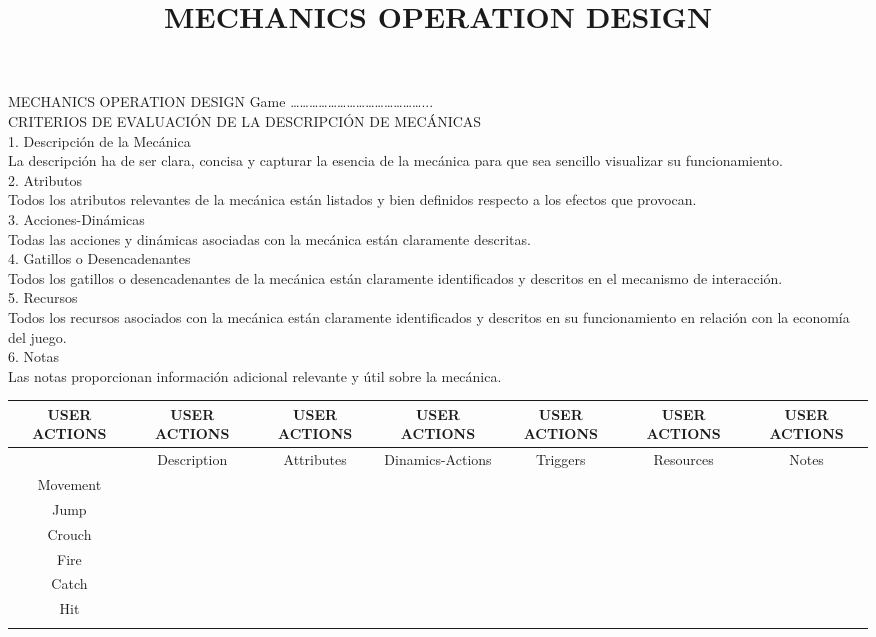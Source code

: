 \documentclass[12pt]{article}
\title{MECHANICS OPERATION DESIGN}
\date{}
\begin{document}
\maketitle

MECHANICS OPERATION DESIGN  Game ……………………………………... \\ 
CRITERIOS DE EVALUACIÓN DE LA DESCRIPCIÓN DE MECÁNICAS \\ 
1. Descripción de la Mecánica \\ 
La descripción ha de ser clara, concisa y capturar la esencia de la mecánica para que sea sencillo visualizar su funcionamiento. \\ 
2. Atributos \\ 
Todos los atributos relevantes de la mecánica están listados y bien definidos respecto a los efectos que provocan. \\ 
3. Acciones-Dinámicas \\ 
Todas las acciones y dinámicas asociadas con la mecánica están claramente descritas. \\ 
4. Gatillos o Desencadenantes \\ 
Todos los gatillos o desencadenantes de la mecánica están claramente identificados y descritos en el mecanismo de interacción. \\ 
5. Recursos \\ 
Todos los recursos asociados con la mecánica están claramente identificados y descritos en su funcionamiento en relación con la economía del juego. \\ 
6. Notas \\ 
Las notas proporcionan información adicional relevante y útil sobre la mecánica. \\ 
\begin{longtable}{|c|c|c|c|c|c|c|}
\hline
USER ACTIONS & USER ACTIONS & USER ACTIONS & USER ACTIONS & USER ACTIONS & USER ACTIONS & USER ACTIONS \\ \hline
 & Description & Attributes & Dinamics-Actions & Triggers & Resources & Notes \\ \hline
Movement &  &  &  &  &  &  \\ \hline
Jump &  &  &  &  &  &  \\ \hline
Crouch &  &  &  &  &  &  \\ \hline
Fire &  &  &  &  &  &  \\ \hline
Catch &  &  &  &  &  &  \\ \hline
Hit &  &  &  &  &  &  \\ \hline
 &  &  &  &  &  &  \\ \hline
\end{longtable}
\end{document}

